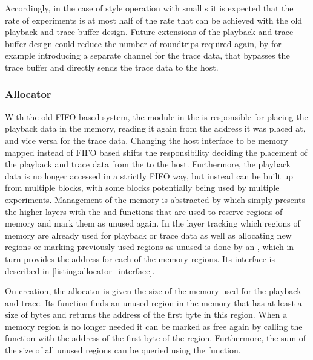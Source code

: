 Accordingly, in the case of \HWinTheLoop{} style operation with small \PlaybackProgram{}s it is expected that the rate of experiments is at most half of the rate that can be achieved with the old playback and trace buffer design.
Future extensions of the playback and trace buffer design could reduce the number of roundtrips required again, by for example introducing a separate channel for the trace data, that bypasses the trace buffer and directly sends the trace data to the host.
\subsubsection{Allocator}
With the old FIFO based system, the \VFIFO{} module in the \FPGA{} is responsible for placing the playback data in the \DDR{} memory, reading it again from the address it was placed at, and vice versa for the trace data.
Changing the host interface to be memory mapped instead of FIFO based shifts the responsibility deciding the placement of the playback and trace data from the \FPGA{} to the host.
Furthermore, the playback data is no longer accessed in a strictly FIFO way, but instead can be built up from multiple blocks, with some blocks potentially being used by multiple experiments.
Management of the memory is abstracted by \ayo{} which simply presents the higher layers with the  and  functions that are used to reserve regions of memory and mark them as unused again.
In the \ayo{} layer tracking which regions of memory are already used for playback or trace data as well as allocating new regions or marking previously used regions as unused is done by an \allocator{}, which in turn provides the address for each of the memory regions. Its interface is described in \autoref{listing:allocator_interface}.

On creation, the allocator is given the size of the memory used for the playback and trace. Its  function finds an unused region in the memory that has at least a size of  bytes and returns the address of the first byte in this region.
When a memory region is no longer needed it can be marked as free again by calling the  function with the address of the first byte of the region.
Furthermore, the sum of the size of all unused regions can be queried using the  function.


